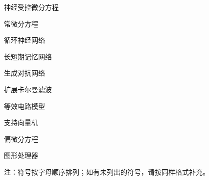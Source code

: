 \begin{denotation}[2.8cm]
  \item[$\mathrm{NCDE}$] 神经受控微分方程
  \item[$\mathrm{ODE}$]  常微分方程
  \item[$\mathrm{RNN}$]  循环神经网络
  \item[$\mathrm{LSTM}$] 长短期记忆网络
  \item[$\mathrm{GAN}$]  生成对抗网络
  \item[$\mathrm{EKF}$]  扩展卡尔曼滤波
  \item[$\mathrm{ECM}$]  等效电路模型
  \item[$\mathrm{SVM}$]  支持向量机
  \item[$\mathrm{PDE}$]  偏微分方程
  \item[$\mathrm{GPU}$]  图形处理器
\end{denotation}

注：符号按字母顺序排列；如有未列出的符号，请按同样格式补充。
